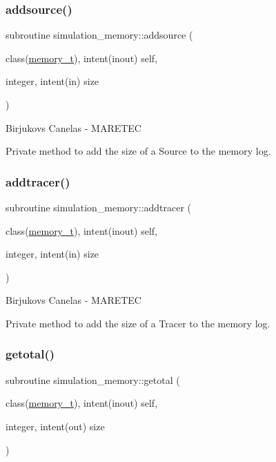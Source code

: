 \subsubsection{\texorpdfstring{addsource()}{addsource()}}
{\footnotesize\ttfamily subroutine simulation\+\_\+memory\+::addsource (\begin{DoxyParamCaption}\item[{class(\hyperlink{structsimulation__memory_1_1memory__t}{memory\+\_\+t}), intent(inout)}]{self,  }\item[{integer, intent(in)}]{size }\end{DoxyParamCaption})\hspace{0.3cm}{\ttfamily [private]}}



Birjukovs Canelas -\/ M\+A\+R\+E\+T\+EC 

Private method to add the size of a Source to the memory log. \mbox{\label{namespacesimulation__memory_a4d6c8bd027a99cb6c7f9ad2eb55c744f}} 
\subsubsection{\texorpdfstring{addtracer()}{addtracer()}}
{\footnotesize\ttfamily subroutine simulation\+\_\+memory\+::addtracer (\begin{DoxyParamCaption}\item[{class(\hyperlink{structsimulation__memory_1_1memory__t}{memory\+\_\+t}), intent(inout)}]{self,  }\item[{integer, intent(in)}]{size }\end{DoxyParamCaption})\hspace{0.3cm}{\ttfamily [private]}}



Birjukovs Canelas -\/ M\+A\+R\+E\+T\+EC 

Private method to add the size of a Tracer to the memory log. \mbox{\label{namespacesimulation__memory_a8589522c4e28cf60741a5439477cdb31}} 
\subsubsection{\texorpdfstring{getotal()}{getotal()}}
{\footnotesize\ttfamily subroutine simulation\+\_\+memory\+::getotal (\begin{DoxyParamCaption}\item[{class(\hyperlink{structsimulation__memory_1_1memory__t}{memory\+\_\+t}), intent(inout)}]{self,  }\item[{integer, intent(out)}]{size }\end{DoxyParamCaption})\hspace{0.3cm}{\ttfamily [private]}}



